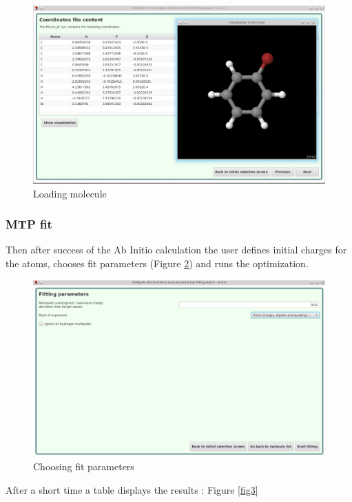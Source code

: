 \documentclass[12pt,a4paper]{article}
\begin{document}

\begin{figure}[h!]
\centering
\includegraphics[width=0.9\linewidth]{pics/scr1}
\caption{Loading molecule}
\label{fig1}
\end{figure}

\subsubsection{MTP fit}

Then after success of the Ab Initio calculation the user defines initial charges for the atoms, 
chooses fit parameters (Figure \ref{fig2}) and runs the optimization. \\

\begin{figure}[h!]
\centering
\includegraphics[width=0.9\linewidth]{pics/scr2}
\caption{Choosing fit parameters}
\label{fig2}
\end{figure}

After a short time a table displays the results : Figure \ref{fig3} \\
\end{document}
